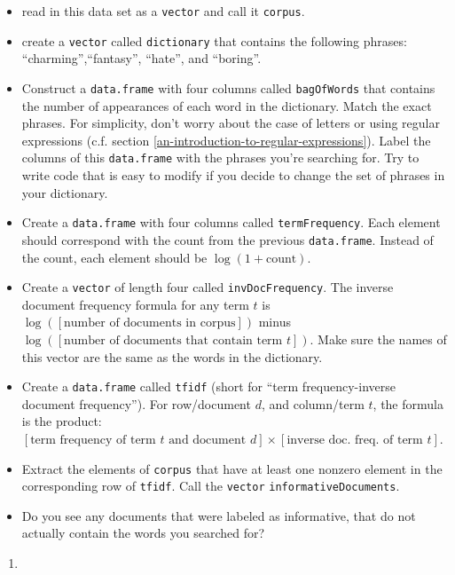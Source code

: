 \documentclass[12pt,krantz2]{krantz}
\providecommand{\tightlist}{%
  \setlength{\itemsep}{0pt}\setlength{\parskip}{0pt}}
\begin{document}
\begin{itemize}
\tightlist
\item
  read in this data set as a \texttt{vector} and call it \texttt{corpus}.
\item
  create a \texttt{vector} called \texttt{dictionary} that contains the following phrases: ``charming'',``fantasy'', ``hate'', and ``boring''.
\item
  Construct a \texttt{data.frame} with four columns called \texttt{bagOfWords} that contains the number of appearances of each word in the dictionary. Match the exact phrases. For simplicity, don't worry about the case of letters or using regular expressions (c.f. section \ref{an-introduction-to-regular-expressions}). Label the columns of this \texttt{data.frame} with the phrases you're searching for. Try to write code that is easy to modify if you decide to change the set of phrases in your dictionary.
\item
  Create a \texttt{data.frame} with four columns called \texttt{termFrequency}. Each element should correspond with the count from the previous \texttt{data.frame}. Instead of the count, each element should be \(\log(1 + \text{count})\).
\item
  Create a \texttt{vector} of length four called \texttt{invDocFrequency}. The inverse document frequency formula for any term \(t\) is \(\log([\text{number of documents in corpus}])\) minus \(\log([\text{number of documents that contain term } t])\). Make sure the names of this vector are the same as the words in the dictionary.
\item
  Create a \texttt{data.frame} called \texttt{tfidf} (short for ``term frequency-inverse document frequency''). For row/document \(d\), and column/term \(t\), the formula is the product: \([\text{term frequency of term } t \text{ and document } d ] \times [\text{inverse doc. freq. of term } t]\).
\item
  Extract the elements of \texttt{corpus} that have at least one nonzero element in the corresponding row of \texttt{tfidf}. Call the \texttt{vector} \texttt{informativeDocuments}.
\item
  Do you see any documents that were labeled as informative, that do not actually contain the words you searched for?
\end{itemize}

\begin{enumerate}
\def\labelenumi{\arabic{enumi}.}
\setcounter{enumi}{1}
\item
\end{enumerate}
\end{document}
